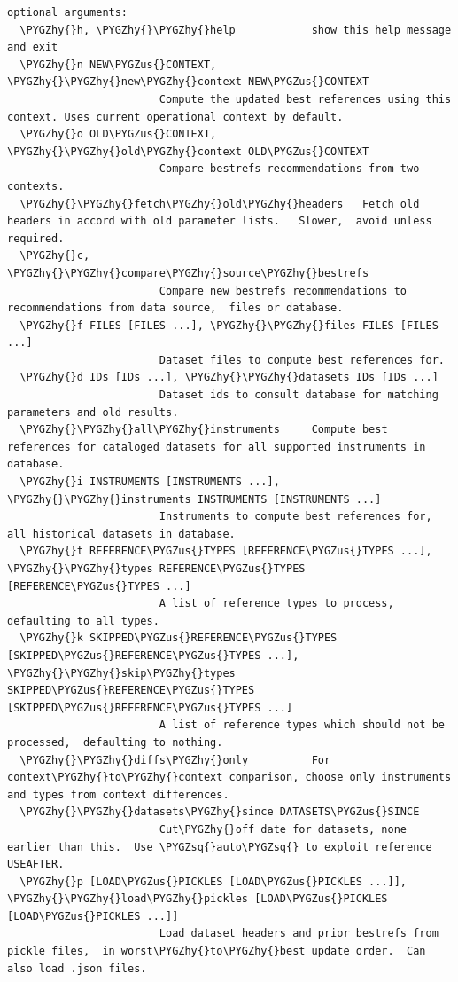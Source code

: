 \documentclass[letterpaper,10pt,english]{sphinxmanual}
\def\PYGZus{\char`\_}
\def\PYGZhy{\char`\-}
\def\PYGZsq{\char`\'}
\renewcommand\PYGZsq{\textquotesingle}
\begin{document}
\begin{Verbatim}[commandchars=\\\{\}]
optional arguments:
  \PYGZhy{}h, \PYGZhy{}\PYGZhy{}help            show this help message and exit
  \PYGZhy{}n NEW\PYGZus{}CONTEXT, \PYGZhy{}\PYGZhy{}new\PYGZhy{}context NEW\PYGZus{}CONTEXT
                        Compute the updated best references using this context. Uses current operational context by default.
  \PYGZhy{}o OLD\PYGZus{}CONTEXT, \PYGZhy{}\PYGZhy{}old\PYGZhy{}context OLD\PYGZus{}CONTEXT
                        Compare bestrefs recommendations from two contexts.
  \PYGZhy{}\PYGZhy{}fetch\PYGZhy{}old\PYGZhy{}headers   Fetch old headers in accord with old parameter lists.   Slower,  avoid unless required.
  \PYGZhy{}c, \PYGZhy{}\PYGZhy{}compare\PYGZhy{}source\PYGZhy{}bestrefs
                        Compare new bestrefs recommendations to recommendations from data source,  files or database.
  \PYGZhy{}f FILES [FILES ...], \PYGZhy{}\PYGZhy{}files FILES [FILES ...]
                        Dataset files to compute best references for.
  \PYGZhy{}d IDs [IDs ...], \PYGZhy{}\PYGZhy{}datasets IDs [IDs ...]
                        Dataset ids to consult database for matching parameters and old results.
  \PYGZhy{}\PYGZhy{}all\PYGZhy{}instruments     Compute best references for cataloged datasets for all supported instruments in database.
  \PYGZhy{}i INSTRUMENTS [INSTRUMENTS ...], \PYGZhy{}\PYGZhy{}instruments INSTRUMENTS [INSTRUMENTS ...]
                        Instruments to compute best references for, all historical datasets in database.
  \PYGZhy{}t REFERENCE\PYGZus{}TYPES [REFERENCE\PYGZus{}TYPES ...], \PYGZhy{}\PYGZhy{}types REFERENCE\PYGZus{}TYPES [REFERENCE\PYGZus{}TYPES ...]
                        A list of reference types to process,  defaulting to all types.
  \PYGZhy{}k SKIPPED\PYGZus{}REFERENCE\PYGZus{}TYPES [SKIPPED\PYGZus{}REFERENCE\PYGZus{}TYPES ...], \PYGZhy{}\PYGZhy{}skip\PYGZhy{}types SKIPPED\PYGZus{}REFERENCE\PYGZus{}TYPES [SKIPPED\PYGZus{}REFERENCE\PYGZus{}TYPES ...]
                        A list of reference types which should not be processed,  defaulting to nothing.
  \PYGZhy{}\PYGZhy{}diffs\PYGZhy{}only          For context\PYGZhy{}to\PYGZhy{}context comparison, choose only instruments and types from context differences.
  \PYGZhy{}\PYGZhy{}datasets\PYGZhy{}since DATASETS\PYGZus{}SINCE
                        Cut\PYGZhy{}off date for datasets, none earlier than this.  Use \PYGZsq{}auto\PYGZsq{} to exploit reference USEAFTER.
  \PYGZhy{}p [LOAD\PYGZus{}PICKLES [LOAD\PYGZus{}PICKLES ...]], \PYGZhy{}\PYGZhy{}load\PYGZhy{}pickles [LOAD\PYGZus{}PICKLES [LOAD\PYGZus{}PICKLES ...]]
                        Load dataset headers and prior bestrefs from pickle files,  in worst\PYGZhy{}to\PYGZhy{}best update order.  Can also load .json files.

\end{Verbatim}
\end{document}
